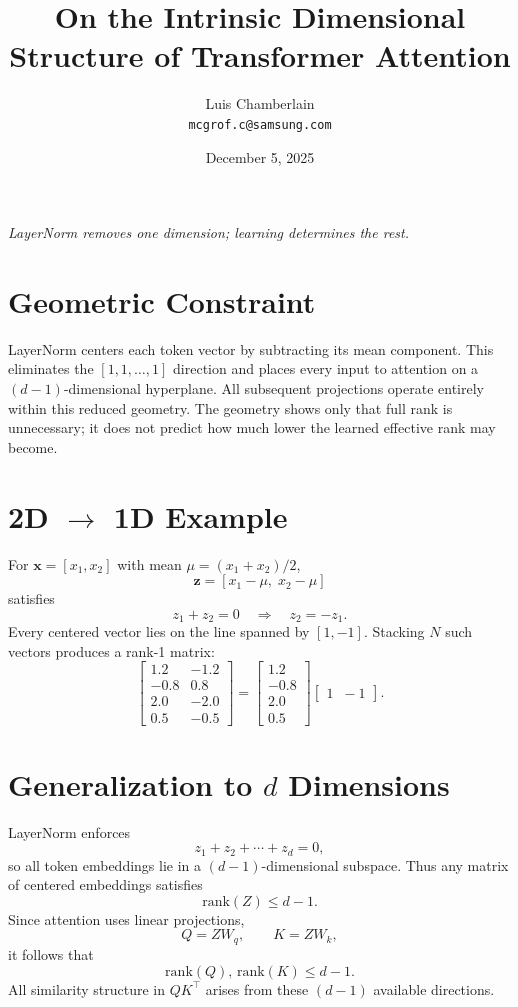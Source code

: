 \documentclass[11pt]{article}
\title{On the Intrinsic Dimensional Structure of Transformer Attention}
\author{Luis Chamberlain \\ \texttt{mcgrof.c@samsung.com}}
\date{December 5, 2025}
\begin{document}
\maketitle
\begin{center}
\textit{LayerNorm removes one dimension; learning determines the rest.}
\end{center}

\section*{Geometric Constraint}

LayerNorm centers each token vector by subtracting its mean component.  
This eliminates the $[1,1,\ldots,1]$ direction and places every input to attention on a $(d{-}1)$-dimensional hyperplane.  
All subsequent projections operate entirely within this reduced geometry.  
The geometry shows only that full rank is unnecessary; it does not predict how much lower the learned effective rank may become.

\section*{2D $\to$ 1D Example}

For $\mathbf{x} = [x_1,x_2]$ with mean $\mu = (x_1+x_2)/2$,
\[
\mathbf{z} = [x_1-\mu,\;x_2-\mu]
\]
satisfies
\[
z_1 + z_2 = 0 \quad\Rightarrow\quad z_2 = -z_1.
\]
Every centered vector lies on the line spanned by $[1,-1]$.  
Stacking $N$ such vectors produces a rank-1 matrix:
\[
\begin{bmatrix}
1.2 & -1.2\\
-0.8 & 0.8\\
2.0 & -2.0\\
0.5 & -0.5
\end{bmatrix}
=
\begin{bmatrix}1.2\\-0.8\\2.0\\0.5\end{bmatrix}
\begin{bmatrix}1\;\; -1\end{bmatrix}.
\]

\section*{Generalization to $d$ Dimensions}

LayerNorm enforces
\[
z_1 + z_2 + \cdots + z_d = 0,
\]
so all token embeddings lie in a $(d{-}1)$-dimensional subspace.  
Thus any matrix of centered embeddings satisfies
\[
\mathrm{rank}(Z) \le d{-}1.
\]
Since attention uses linear projections,
\[
Q = ZW_q,\qquad K = ZW_k,
\]
it follows that
\[
\mathrm{rank}(Q),\,\mathrm{rank}(K) \le d{-}1.
\]
All similarity structure in $QK^\top$ arises from these $(d{-}1)$ available directions.
\end{document}
